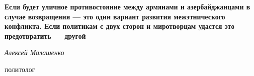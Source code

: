 \begin{leftbar}
	\begingroup
	\color{orange}
	\bfseries
Если будет уличное противостояние между армянами и азербайджанцами в случае
возвращения --- это один вариант развития межэтнического конфликта. Если
политикам с двух сторон и миротворцам удастся это предотвратить —
другой\par
	\endgroup
\em
Алексей Малашенко\par
политолог\par
\end{leftbar}
